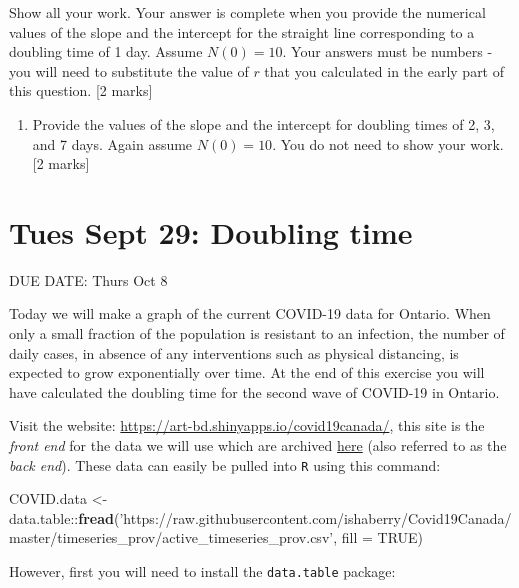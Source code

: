 \documentclass[]{book}
\newenvironment{Shaded}{\begin{snugshade}}{\end{snugshade}}
\newcommand{\KeywordTok}[1]{\textcolor[rgb]{0.13,0.29,0.53}{\textbf{{#1}}}}
\newcommand{\DataTypeTok}[1]{\textcolor[rgb]{0.13,0.29,0.53}{{#1}}}
\newcommand{\StringTok}[1]{\textcolor[rgb]{0.31,0.60,0.02}{{#1}}}
\newcommand{\OtherTok}[1]{\textcolor[rgb]{0.56,0.35,0.01}{{#1}}}
\newcommand{\NormalTok}[1]{{#1}}
\providecommand{\tightlist}{%
  \setlength{\itemsep}{0pt}\setlength{\parskip}{0pt}}
\begin{document}
Show all your work. Your answer is complete when you provide the
numerical values of the slope and the intercept for the straight line
corresponding to a doubling time of 1 day. Assume \(N(0)=10\). Your
answers must be numbers - you will need to substitute the value of \(r\)
that you calculated in the early part of this question. {[}2 marks{]}

\begin{enumerate}
\def\labelenumi{\arabic{enumi}.}
\setcounter{enumi}{8}
\tightlist
\item
  Provide the values of the slope and the intercept for doubling times
  of 2, 3, and 7 days. Again assume \(N(0)=10\). You do not need to show
  your work. {[}2 marks{]}
\end{enumerate}

\chapter{Tues Sept 29: Doubling time}\label{tues-sept-29-doubling-time}

DUE DATE: Thurs Oct 8

Today we will make a graph of the current COVID-19 data for Ontario.
When only a small fraction of the population is resistant to an
infection, the number of daily cases, in absence of any interventions
such as physical distancing, is expected to grow exponentially over
time. At the end of this exercise you will have calculated the doubling
time for the second wave of COVID-19 in Ontario.

Visit the website: \url{https://art-bd.shinyapps.io/covid19canada/},
this site is the \emph{front end} for the data we will use which are
archived \href{https://github.com/ishaberry/Covid19Canada}{here} (also
referred to as the \emph{back end}). These data can easily be pulled
into \texttt{R} using this command:

\begin{Shaded}
\begin{Highlighting}[]
\NormalTok{COVID.data <-}\StringTok{ }\NormalTok{data.table::}\KeywordTok{fread}\NormalTok{(}\StringTok{'https://raw.githubusercontent.com/ishaberry/Covid19Canada/master/timeseries_prov/active_timeseries_prov.csv'}\NormalTok{, }\DataTypeTok{fill =} \OtherTok{TRUE}\NormalTok{)}
\end{Highlighting}
\end{Shaded}

However, first you will need to install the \texttt{data.table} package:
\end{document}
